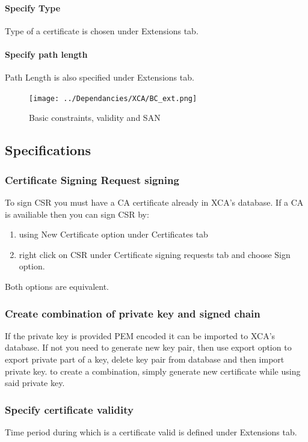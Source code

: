 \documentclass[10pt, a4paper]{report}
\begin{document}
      \paragraph{Specify Type}
Type of a certificate is chosen under Extensions tab.
      \paragraph{Specify path length}
Path Length is also specified under Extensions tab.

\begin{figure}[!ht]
 \caption{Basic constraints, validity and SAN}
 \centering
  \texttt{[image: ../Dependancies/XCA/BC\_ext.png]}
\end{figure}

  \subsection{Specifications}
  
    \subsubsection{Certificate Signing Request signing}
To sign CSR you must have a CA certificate already in XCA's database. If a CA is availiable then you can sign CSR by:

\begin{enumerate}
\item using New Certificate option under Certificates tab 
\item right click on CSR under Certificate signing requests tab and choose Sign option. 
\end{enumerate}
Both options are equivalent.    

    \subsubsection{Create combination of private key and signed chain}
If the private key is provided PEM encoded it can be imported to XCA's database. If not you need to generate new key pair, then use export option to export private part of a key, delete key pair from database and then import private key. to create a combination, simply generate new certificate while using said private key.
    \subsubsection{Specify certificate validity}
Time period during which is a certificate valid is defined under Extensions tab.
\end{document}

